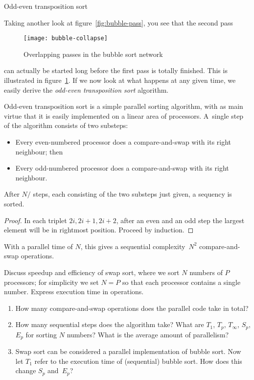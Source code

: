  {Odd-even transposition sort}

Taking another look at figure~\ref{fig:bubble-pass}, you see that the
second pass
%
\begin{figure}[ht]
  \texttt{[image: bubble-collapse]}
  \caption{Overlapping passes in the bubble sort network}
  \label{fig:bubble-collapse}
\end{figure}
%
can actually be started long before the first pass is totally
finished. This is illustrated in figure~\ref{fig:bubble-collapse}.
If we now look at what happens at any given time, we easily derive the 
\emph{odd-even transposition sort} algorithm.

Odd-even transposition sort is a simple parallel sorting
algorithm, with as main virtue that it is easily implemented
on a linear area of processors. A~single step of the
algorithm consists of two substeps:
\begin{itemize}
\item Every even-numbered processor does a compare-and-swap
  with its right neighbour; then
\item Every odd-numbered processor does a compare-and-swap
  with its right neighbour.
\end{itemize}

\begin{theorem}
  After $N/$ steps, each consisting of the two substeps just given,
  a sequency is sorted.
\end{theorem}
\begin{proof}
  In each triplet $2i,2i+1,2i+2$, after an even and an odd step the
  largest element will be in rightmost position. Proceed by induction.
\end{proof}

With a parallel time of $N$, this gives a sequential complexity~$N^2$
compare-and-swap operations.

\begin{exercise}
  \label{ex:swapsort}
  Discuss speedup and efficiency of swap sort, where we sort $N$
  numbers of $P$ processors; for simplicity we set $N=P$ so that
  each processor contains a single number. Express execution time
  in  operations.
  \begin{enumerate}
  \item How many compare-and-swap operations does the parallel code
    take in total?
  \item How many sequential steps does the algorithm take? What are
    $T_1$, $T_p$, $T_\infty$, $S_p$, $E_p$ for sorting $N$ numbers?
    What is the average amount of parallelism?
  \item Swap sort can be considered a parallel implementation of
    bubble sort. Now let $T_1$ refer to the execution time of
    (sequential) bubble sort. How does this change $S_p$ and~$E_p$?
  \end{enumerate}
\end{exercise}

